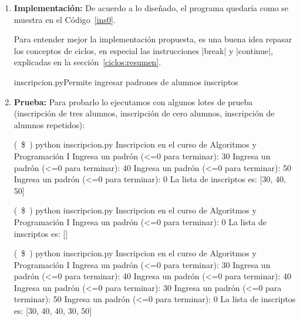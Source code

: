 \begin{enumerate}
\begin{itemize}
\begin{codigo-nohl-sn}
La lista de inscriptos es vacía
Repetir indefinidamente:
    Pedir padrón
    Si el padrón no es positivo:
        Salir del ciclo
	Agregar el padrón a la lista
Devolver la lista de inscriptos
\end{codigo-nohl-sn}

\end{itemize}

\item {\bf Implementación:}
De acuerdo a lo diseñado, el programa quedaría como
se muestra en el Código~\ref{ins0}.

\begin{observacion}
Para entender mejor la implementación propuesta, es una buena idea repasar los
conceptos de ciclos, en especial las instrucciones |break| y |continue|,
explicadas en la sección~\ref{ciclos:resumen}.
\end{observacion}

\begin{codigo}{inscripcion.py}{Permite ingresar padrones de alumnos
inscriptos}
\label{ins0}

\end{codigo}

\item {\bf Prueba:}
Para probarlo lo ejecutamos con algunos lotes de prueba (inscripción de
tres alumnos, inscripción de cero alumnos, inscripción de alumnos
repetidos):

\begin{codigo-nohl-sn}
(~\$~) python inscripcion.py
Inscripcion en el curso de Algoritmos y Programación I
Ingresa un padrón (<=0 para terminar): 30
Ingresa un padrón (<=0 para terminar): 40
Ingresa un padrón (<=0 para terminar): 50
Ingresa un padrón (<=0 para terminar): 0
La lista de inscriptos es: [30, 40, 50]

(~\$~) python inscripcion.py
Inscripcion en el curso de Algoritmos y Programación I
Ingresa un padrón (<=0 para terminar): 0
La lista de inscriptos es: []

(~\$~) python inscripcion.py
Inscripcion en el curso de Algoritmos y Programación I
Ingresa un padrón (<=0 para terminar): 30
Ingresa un padrón (<=0 para terminar): 40
Ingresa un padrón (<=0 para terminar): 40
Ingresa un padrón (<=0 para terminar): 30
Ingresa un padrón (<=0 para terminar): 50
Ingresa un padrón (<=0 para terminar): 0
La lista de inscriptos es: [30, 40, 40, 30, 50]
\end{codigo-nohl-sn}


\end{enumerate}
